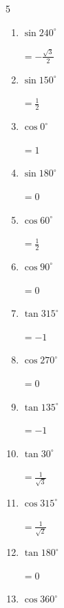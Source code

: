 \begin{multicols}{5}
\begin{enumerate}
        $\displaystyle =-\frac{\sqrt{3}}{2}$

  \item $\displaystyle \sin{240^\circ}$

        $\displaystyle =-\frac{\sqrt{3}}{2}$

  \item $\displaystyle \sin{150^\circ}$

        $\displaystyle =\frac{1}{2}$

  \item $\displaystyle \cos{0^\circ}$

        $\displaystyle =1$

  \item $\displaystyle \sin{180^\circ}$

        $\displaystyle =0$

  \item $\displaystyle \cos{60^\circ}$

        $\displaystyle =\frac{1}{2}$

  \item $\displaystyle \cos{90^\circ}$

        $\displaystyle =0$

  \item $\displaystyle \tan{315^\circ}$

        $\displaystyle =-1$

\columnbreak %

\resetques

  \item $\displaystyle \cos{270^\circ}$

        $\displaystyle =0$

  \item $\displaystyle \tan{135^\circ}$

        $\displaystyle =-1$

  \item $\displaystyle \tan{30^\circ}$

        $\displaystyle =\frac{1}{\sqrt{3}}$

  \item $\displaystyle \cos{315^\circ}$

        $\displaystyle =\frac{1}{\sqrt{2}}$

  \item $\displaystyle \tan{180^\circ}$

        $\displaystyle =0$

  \item $\displaystyle \cos{360^\circ}$


\end{enumerate}
\end{multicols}

